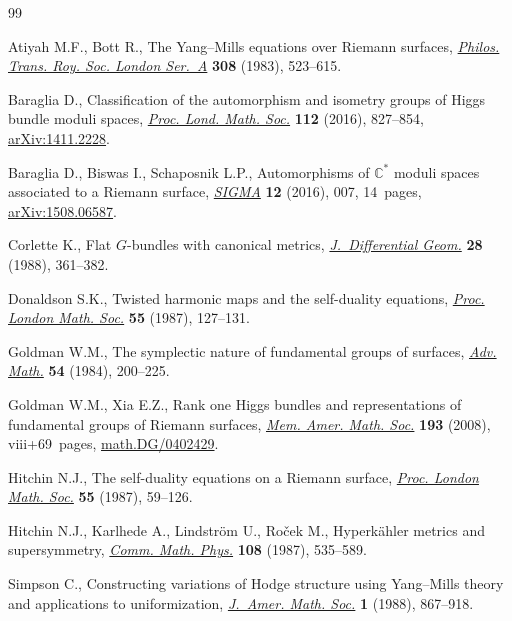 \documentclass[pdftex]{sigma}
\numberwithin{equation}{section}
\begin{document}
\begin{thebibliography}{99}
\footnotesize\itemsep=0pt

Atiyah M.F., Bott R., The {Y}ang--{M}ills equations over {R}iemann surfaces,
 \href{https://doi.org/10.1098/rsta.1983.0017}{\textit{Philos. Trans. Roy. Soc. London Ser.~A}} \textbf{308} (1983),
 523--615.

Baraglia D., Classif\/ication of the automorphism and isometry groups of {H}iggs
 bundle moduli spaces, \href{https://doi.org/10.1112/plms/pdw014}{\textit{Proc. Lond. Math. Soc.}} \textbf{112} (2016),
 827--854, \href{https://arxiv.org/abs/1411.2228}{arXiv:1411.2228}.

Baraglia D., Biswas I., Schaposnik L.P., Automorphisms of {$\mathbb{C}^*$}
 moduli spaces associated to a {R}iemann surface, \href{https://doi.org/10.3842/SIGMA.2016.007}{\textit{SIGMA}} \textbf{12}
 (2016), 007, 14~pages, \href{https://arxiv.org/abs/1508.06587}{arXiv:1508.06587}.

Corlette K., Flat {$G$}-bundles with canonical metrics, \href{https://doi.org/10.4310/jdg/1214442469}{\textit{J.~Differential
 Geom.}} \textbf{28} (1988), 361--382.

Donaldson S.K., Twisted harmonic maps and the self-duality equations,
 \href{https://doi.org/10.1112/plms/s3-55.1.127}{\textit{Proc. London Math. Soc.}} \textbf{55} (1987), 127--131.

Goldman W.M., The symplectic nature of fundamental groups of surfaces,
 \href{https://doi.org/10.1016/0001-8708(84)90040-9}{\textit{Adv. Math.}} \textbf{54} (1984), 200--225.

Goldman W.M., Xia E.Z., Rank one {H}iggs bundles and representations of
 fundamental groups of {R}iemann surfaces, \href{https://doi.org/10.1090/memo/0904}{\textit{Mem. Amer. Math. Soc.}}
 \textbf{193} (2008), viii+69~pages, \href{https://arxiv.org/abs/math.DG/0402429}{math.DG/0402429}.

Hitchin N.J., The self-duality equations on a {R}iemann surface, \href{https://doi.org/10.1112/plms/s3-55.1.59}{\textit{Proc.
 London Math. Soc.}} \textbf{55} (1987), 59--126.

Hitchin N.J., Karlhede A., Lindstr\"om U., Ro\v{c}ek M., Hyperk\"ahler metrics
 and supersymmetry, \href{https://doi.org/10.1007/BF01214418}{\textit{Comm. Math. Phys.}} \textbf{108} (1987), 535--589.

Simpson C., Constructing variations of {H}odge structure using
 {Y}ang--{M}ills theory and applications to uniformization, \href{https://doi.org/10.2307/1990994}{\textit{J.~Amer.
 Math. Soc.}} \textbf{1} (1988), 867--918.


\end{thebibliography}
\end{document}
